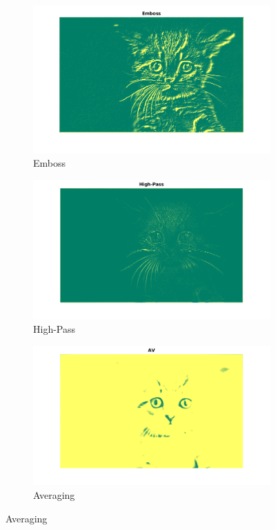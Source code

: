 \documentclass{beamer}
\begin{document}
\begin{frame}

\begin{figure}[h]
\begin{subfigure}[t]{0.3\textwidth}
\includegraphics[scale=.2]{boss_kitty1.png}
\caption{Emboss}
\end{subfigure}
\begin{subfigure}[t]{0.3\textwidth}
\includegraphics[scale=.2]{HP_kitty1.png}
\caption{High-Pass}
\end{subfigure}
\begin{subfigure}[t]{0.3\textwidth}
\includegraphics[scale=.2]{AV_kitty1.png}
\caption{Averaging}
\end{subfigure}
\end{figure}




\end{frame}
\end{document}
